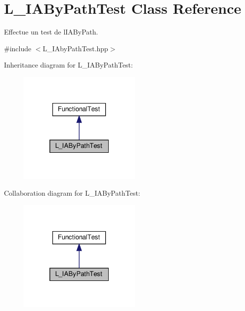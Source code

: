 \hypertarget{classL__IAByPathTest}{}\section{L\+\_\+\+I\+A\+By\+Path\+Test Class Reference}
\label{classL__IAByPathTest}


Effectue un test de l\textquotesingle{}I\+A\+By\+Path.  




{\ttfamily \#include $<$L\+\_\+\+I\+Aby\+Path\+Test.\+hpp$>$}



Inheritance diagram for L\+\_\+\+I\+A\+By\+Path\+Test\+:
\nopagebreak
\begin{figure}[H]
\begin{center}
\leavevmode
\includegraphics[width=169pt]{classL__IAByPathTest__inherit__graph}
\end{center}
\end{figure}


Collaboration diagram for L\+\_\+\+I\+A\+By\+Path\+Test\+:
\nopagebreak
\begin{figure}[H]
\begin{center}
\leavevmode
\includegraphics[width=169pt]{classL__IAByPathTest__coll__graph}
\end{center}
\end{figure}
